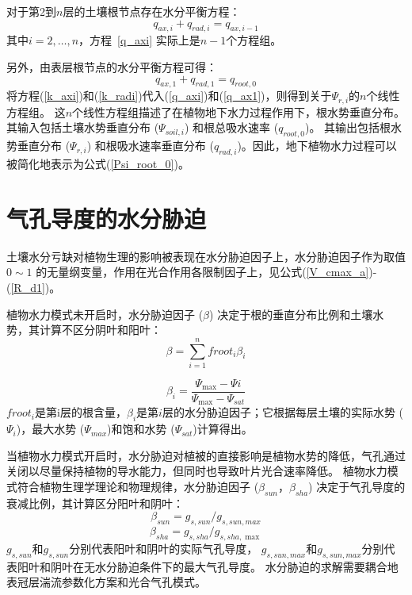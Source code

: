 对于第2到$n$层的土壤根节点存在水分平衡方程：
\begin{equation}\label{q_axi}
q_{a x, i}+q_{r a d, i}=q_{a x, i-1}
\end{equation}
其中$i=2, \ldots, n$，方程~\eqref{q_axi} 实际上是$n-1$个方程组。


另外，由表层根节点的水分平衡方程可得：
\begin{equation}\label{q_ax1}
q_{ax,1}+q_{rad, 1}=q_{root,0}
\end{equation}
将方程(\ref{k_axi})和(\ref{k_radi})代入(\ref{q_axi})和(\ref{q_ax1})，则得到关于$ \Psi_{r,i}$的$n$个线性方程组。
这$n$个线性方程组描述了在植物地下水力过程作用下，根水势垂直分布。其输入包括土壤水势垂直分布 ($\Psi_{soil,i}$) 和根总吸水速率 ($q_{root,0}$)。
其输出包括根水势垂直分布 ($\Psi_{r,i}$) 和根吸水速率垂直分布 ($q_{rad,i}$)。因此，地下植物水力过程可以被简化地表示为公式(\ref{Psi_root_0})。

\section{气孔导度的水分胁迫}\label{气孔导度的水分胁迫}
土壤水分亏缺对植物生理的影响被表现在水分胁迫因子上，水分胁迫因子作为取值 $0\sim 1$ 的无量纲变量，作用在光合作用各限制因子上，见公式(\ref{V_cmax_a})-(\ref{R_d1})。

植物水力模式未开启时，水分胁迫因子 ($\beta$) 决定于根的垂直分布比例和土壤水势，其计算不区分阴叶和阳叶：
\begin{equation}\label{beta_0}
\beta=\sum_{i=1}^{n} froot_i \beta_{i}
\end{equation}

\begin{equation}\label{beta_i}
\beta_{i}=\frac{\Psi_{\max }-\Psi i}{\Psi_{\max }-\Psi_{s a t}}
\end{equation}
$froot_i$是第i层的根含量，$\beta_i$是第$i$层的水分胁迫因子；它根据每层土壤的实际水势 (${\Psi}_i$)，最大水势 (${\Psi}_{max}$)和饱和水势 (${\Psi}_{sat}$)计算得出。

当植物水力模式开启时，水分胁迫对植被的直接影响是植物水势的降低，气孔通过关闭以尽量保持植物的导水能力，但同时也导致叶片光合速率降低。
植物水力模式符合植物生理学理论和物理规律，水分胁迫因子 ($\beta_{sun}$，$\beta_{sha}$) 决定于气孔导度的衰减比例，其计算区分阳叶和阴叶：
\begin{equation}\label{beta_sun}
\beta_{sun}=g_{s,sun} / g_{s,sun,max }
\end{equation}
\begin{equation}\label{beta_sha}
\beta_{sha}=g_{s,sha} / g_{s,sha, \max }
\end{equation}
$g_{s,sun}$和$g_{s,sun}$分别代表阳叶和阴叶的实际气孔导度，
$g_{s,sun,max}$和$g_{s,sun,max}$分别代表阳叶和阴叶在无水分胁迫条件下的最大气孔导度。
水分胁迫的求解需要耦合地表冠层湍流参数化方案和光合气孔模式。


